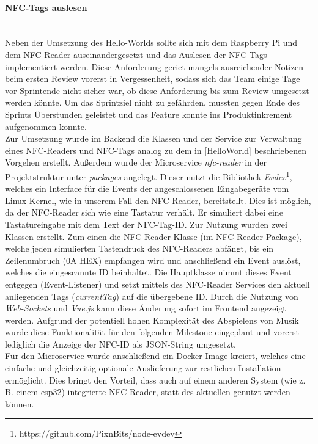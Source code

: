 \documentclass[10pt, a4paper]{article}
\begin{document}
\begin{onehalfspace}
\paragraph*{NFC-Tags auslesen} $~$ \\
Neben der Umsetzung des Hello-Worlds sollte sich mit dem Raspberry Pi und dem NFC-Reader auseinandergesetzt und das Auslesen der NFC-Tags implementiert werden. Diese Anforderung geriet mangels ausreichender Notizen beim ersten Review vorerst
in Vergessenheit, sodass sich das Team einige Tage vor Sprintende nicht sicher war, ob diese Anforderung bis zum Review umgesetzt werden könnte.
Um das Sprintziel nicht zu gefährden, mussten gegen Ende des Sprints Überstunden geleistet und das Feature konnte ins Produktinkrement aufgenommen konnte.
\\
Zur Umsetzung wurde im Backend die Klassen und der Service zur Verwaltung eines NFC-Readers und NFC-Tags
analog zu dem in \ref{HelloWorld} beschriebenen Vorgehen erstellt.
Außerdem wurde der Microservice \textit{nfc-reader} in der Projektstruktur unter \textit{packages}
angelegt. Dieser nutzt die Bibliothek \textit{Evdev}\footnote{https://github.com/PixnBits/node-evdev}, welches ein Interface für die Events der angeschlossenen
Eingabegeräte vom Linux-Kernel, wie in unserem Fall den NFC-Reader, bereitstellt. Dies ist möglich, da der NFC-Reader sich wie eine Tastatur verhält. Er
simuliert dabei eine Tastatureingabe mit dem Text der NFC-Tag-ID. Zur Nutzung wurden zwei Klassen erstellt. Zum einen die NFC-Reader Klasse
(im NFC-Reader Package), welche jeden simulierten Tastendruck des NFC-Readers abfängt, bis ein Zeilenumbruch (0A HEX) empfangen
wird und anschließend ein Event auslöst, welches die eingescannte ID beinhaltet. Die Hauptklasse nimmt dieses Event entgegen (Event-Listener) und setzt mittels des
NFC-Reader Services den aktuell anliegenden Tags (\textit{currentTag}) auf die übergebene ID. Durch die Nutzung von \textit{Web-Sockets} und \textit{Vue.js}
kann diese Änderung sofort im Frontend angezeigt werden. Aufgrund der potentiell hohen Komplexität des Abspielens von Musik wurde diese Funktionalität für den
folgenden Milestone eingeplant und vorerst lediglich die Anzeige der NFC-ID als JSON-String umgesetzt.
\\
Für den Microservice wurde anschließend ein Docker-Image kreiert, welches eine einfache und gleichzeitig optionale Auslieferung zur restlichen Installation
ermöglicht. Dies bringt den Vorteil, dass auch auf einem anderen System (wie z. B. einem esp32) integrierte NFC-Reader, statt des aktuellen genutzt werden können.


\end{onehalfspace}
\end{document}
